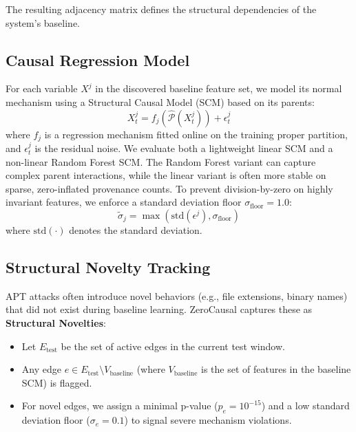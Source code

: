 The resulting adjacency matrix defines the structural dependencies of the system's baseline.

\subsection{Causal Regression Model}
For each variable $X^j$ in the discovered baseline feature set, we model its normal mechanism using a Structural Causal Model (SCM) based on its parents:
\begin{equation}
X^j_t = f_j(\widehat{\mathcal{P}}(X^j_t)) + \epsilon^j_t
\end{equation}
where $f_j$ is a regression mechanism fitted online on the training proper partition, and $\epsilon^j_t$ is the residual noise. We evaluate both a lightweight linear SCM and a non-linear Random Forest SCM. The Random Forest variant can capture complex parent interactions, while the linear variant is often more stable on sparse, zero-inflated provenance counts. To prevent division-by-zero on highly invariant features, we enforce a standard deviation floor $\sigma_{\text{floor}} = 1.0$:
\begin{equation}
\tilde{\sigma}_j = \max(\text{std}(\epsilon^j), \sigma_{\text{floor}})
\end{equation}
where $\text{std}(\cdot)$ denotes the standard deviation.

\subsection{Structural Novelty Tracking}
APT attacks often introduce novel behaviors (e.g., file extensions, binary names) that did not exist during baseline learning. ZeroCausal captures these as \textbf{Structural Novelties}:
\begin{itemize}
\item Let $E_{\text{test}}$ be the set of active edges in the current test window.
\item Any edge $e \in E_{\text{test}} \setminus V_{\text{baseline}}$ (where $V_{\text{baseline}}$ is the set of features in the baseline SCM) is flagged.
\item For novel edges, we assign a minimal p-value ($p_e = 10^{-15}$) and a low standard deviation floor ($\sigma_e = 0.1$) to signal severe mechanism violations.
\end{itemize}

